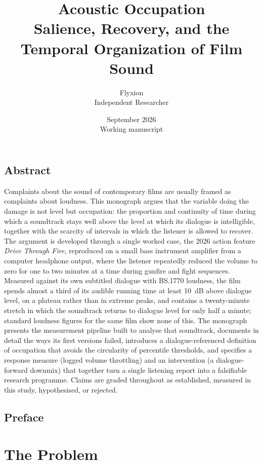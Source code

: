 \documentclass[11pt,openany]{book}
\title{\textbf{Acoustic Occupation}\\[0.6em]
\Large Salience, Recovery, and the Temporal Organization of Film Sound}
\author{Flyxion\\ \small Independent Researcher}
\date{September 2026\\[1em]\small Working manuscript}
\theoremstyle{definition}
\theoremstyle{remark}
\begin{document}
\frontmatter
\maketitle

\chapter*{Abstract}
Complaints about the sound of contemporary films are usually framed as complaints about loudness. This monograph argues that the variable doing the damage is not level but occupation: the proportion and continuity of time during which a soundtrack stays well above the level at which its dialogue is intelligible, together with the scarcity of intervals in which the listener is allowed to recover. The argument is developed through a single worked case, the 2026 action feature \emph{Drive Through Fire}, reproduced on a small bass instrument amplifier from a computer headphone output, where the listener repeatedly reduced the volume to zero for one to two minutes at a time during gunfire and fight sequences. Measured against its own subtitled dialogue with BS.1770 loudness, the film spends almost a third of its audible running time at least 10~dB above dialogue level, on a plateau rather than in extreme peaks, and contains a twenty-minute stretch in which the soundtrack returns to dialogue level for only half a minute; standard loudness figures for the same film show none of this. The monograph presents the measurement pipeline built to analyse that soundtrack, documents in detail the ways its first versions failed, introduces a dialogue-referenced definition of occupation that avoids the circularity of percentile thresholds, and specifies a response measure (logged volume throttling) and an intervention (a dialogue-forward downmix) that together turn a single listening report into a falsifiable research programme. Claims are graded throughout as established, measured in this study, hypothesised, or rejected.

\chapter*{Preface}


\tableofcontents

\mainmatter

\part{The Problem}



\end{document}
